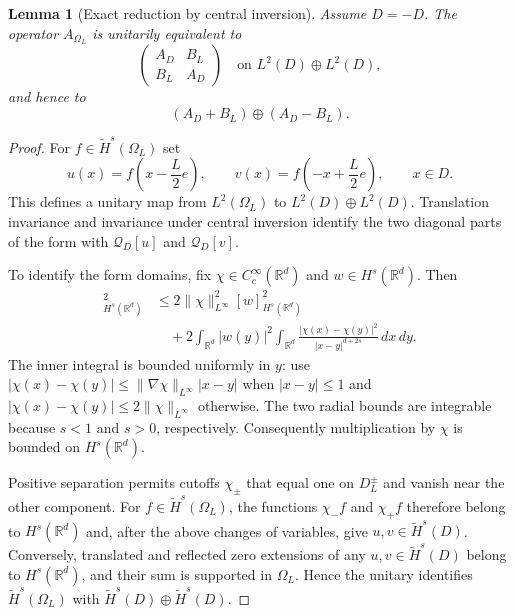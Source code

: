 \documentclass[twoside,10pt]{article}
\numberwithin{equation}{section}
\theoremstyle{slbody}
\newtheorem{lemma}[theorem]{Lemma}
\theoremstyle{definition}
\newcommand{\R}{\mathbb{R}}
\newcommand{\Hs}{\widetilde H^s}
\newcommand{\norm}[1]{\lVert #1\rVert}
\newcommand{\abs}[1]{\lvert #1\rvert}
\begin{document}
\begin{lemma}[Exact reduction by central inversion]\label{lem:block}
Assume $D=-D$.  The operator $A_{\Omega_L}$ is unitarily equivalent to
\[
 \begin{pmatrix}A_D&B_L\\B_L&A_D\end{pmatrix}
 \quad\text{on }L^2(D)\oplus L^2(D),
\]
and hence to
\begin{equation}\label{eq:direct-sum}
 (A_D+B_L)\oplus(A_D-B_L).
\end{equation}
\end{lemma}

\begin{proof}
For $f\in\Hs(\Omega_L)$ set
\[
 u(x)=f\left(x-\frac L2e\right),
 \qquad
 v(x)=f\left(-x+\frac L2e\right),
 \qquad x\in D.
\]
This defines a unitary map from $L^2(\Omega_L)$ to
$L^2(D)\oplus L^2(D)$.  Translation invariance and invariance under central
inversion identify the two diagonal parts of the form with $\mathcal{Q}_D[u]$ and
$\mathcal{Q}_D[v]$.

To identify the form domains, fix $\chi\in C_c^\infty(\R^d)$ and
$w\in H^s(\R^d)$.  Then
\begin{align*}
 [\chi w]_{H^s(\R^d)}^2
 &\leq 2\norm{\chi}_{L^\infty}^2[w]_{H^s(\R^d)}^2\\
 &\quad+2\int_{\R^d}\abs{w(y)}^2
 \int_{\R^d}\frac{\abs{\chi(x)-\chi(y)}^2}
 {\abs{x-y}^{d+2s}}\,dx\,dy.
\end{align*}
The inner integral is bounded uniformly in $y$: use
$\abs{\chi(x)-\chi(y)}\leq\norm{\nabla\chi}_{L^\infty}\abs{x-y}$
when $\abs{x-y}\leq1$ and
$\abs{\chi(x)-\chi(y)}\leq2\norm{\chi}_{L^\infty}$ otherwise.  The two
radial bounds are integrable because $s<1$ and $s>0$, respectively.
Consequently multiplication by $\chi$ is bounded on $H^s(\R^d)$.

Positive separation permits cutoffs $\chi_\pm$ that equal one on
$D_L^\pm$ and vanish near the other component.  For
$f\in\Hs(\Omega_L)$, the functions $\chi_-f$ and $\chi_+f$ therefore
belong to $H^s(\R^d)$ and, after the above changes of variables, give
$u,v\in\Hs(D)$.  Conversely, translated and reflected zero extensions of
any $u,v\in\Hs(D)$ belong to $H^s(\R^d)$, and their sum is supported in
$\Omega_L$.  Hence the unitary identifies $\Hs(\Omega_L)$ with
$\Hs(D)\oplus\Hs(D)$.


\end{proof}
\end{document}
